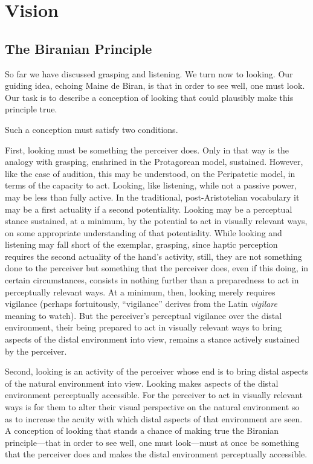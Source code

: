 \chapter{Vision} %
\label{cha:vision}

\section{The Biranian Principle} %
\label{sec:the_birnaian_principle}

So far we have discussed grasping and listening. We turn now to looking. Our guiding idea, echoing Maine de Biran, is that in order to see well, one must look. Our task is to describe a conception of looking that could plausibly make this principle true. 

Such a conception must satisfy two conditions. 

First, looking must be something the perceiver does. Only in that way is the analogy with grasping, enshrined in the Protagorean model, sustained. However, like the case of audition, this may be understood, on the Peripatetic model, in terms of the capacity to act. Looking, like listening, while not a passive power, may be less than fully active. In the traditional, post-Aristotelian vocabulary it may be a first actuality if a second potentiality. Looking may be a perceptual stance sustained, at a minimum, by the potential to act in visually relevant ways, on some appropriate understanding of that potentiality. While looking and listening may fall short of the exemplar, grasping, since haptic perception requires the second actuality of the hand's activity, still, they are not something done to the perceiver but something that the perceiver does, even if this doing, in certain circumstances, consists in nothing further than a preparedness to act in perceptually relevant ways. At a minimum, then, looking merely requires vigilance (perhaps fortuitously, ``vigilance'' derives from the Latin \emph{vigilare} meaning to watch). But the perceiver's perceptual vigilance over the distal environment, their being prepared to act in visually relevant ways to bring aspects of the distal environment into view, remains a stance actively sustained by the perceiver.

Second, looking is an activity of the perceiver whose end is to bring distal aspects of the natural environment into view. Looking makes aspects of the distal environment perceptually accessible. For the perceiver to act in visually relevant ways is for them to alter their visual perspective on the natural environment so as to increase the acuity with which distal aspects of that environment are seen. A conception of looking that stands a chance of making true the Biranian principle---that in order to see well, one must look---must at once be something that the perceiver does and makes the distal environment perceptually accessible. 


